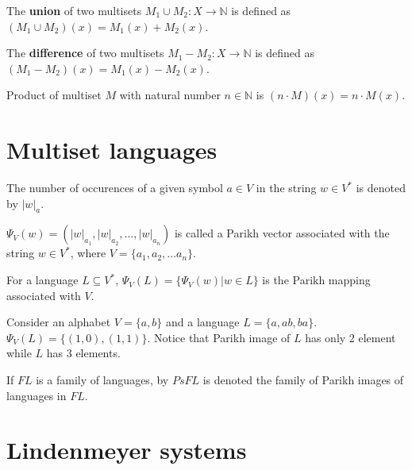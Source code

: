 \begin{definition}
The {\bf union} of two multisets $M_1\cup M_2 : X\rightarrow \mathbb N$ is defined as $(M_1\cup M_2)(x)=M_1(x)+M_2(x)$.
\end{definition}

\begin{definition}
The {\bf difference} of two multisets $M_1-M_2 : X\rightarrow \mathbb N$ is defined as $(M_1-M_2)(x)=M_1(x)-M_2(x)$.
\end{definition}

\begin{definition}
Product of multiset $M$ with natural number $n\in \mathbb N$ is $(n\cdot M)(x)=n\cdot M(x)$.  
\end{definition}


\section{Multiset languages} %
\label{sec:multiset_languages}

The number of occurences of a given symbol $a\in V$ in the string $w\in V^*$ is denoted by $|w|_a$.

\begin{definition}
$\Psi_V(w)=(|w|_{a_1},|w|_{a_2},\dots,|w|_{a_n})$ is called a Parikh vector associated with the string $w\in V^*$, where $V=\{a_1,a_2,\dots a_n\}$.
\end{definition}

\begin{definition}
For a language $L\subseteq V^*$, $\Psi_V(L)=\{\Psi_V(w)|w\in L\}$ is the Parikh mapping associated with $V$.
\end{definition}

\begin{example}
Consider an alphabet $V=\{a,b\}$ and a language $L=\{a, ab, ba\}$.
$\Psi_V(L)=\{(1,0), (1,1)\}$. Notice that Parikh image of $L$ has only 2 element while $L$ has 3 elements.
\end{example}

\begin{definition}
If $FL$ is a family of languages, by $PsFL$ is denoted the family of Parikh images of languages in $FL$.
\end{definition}



\section{Lindenmeyer systems} %
\label{sec:lindenmeyer_systems}

